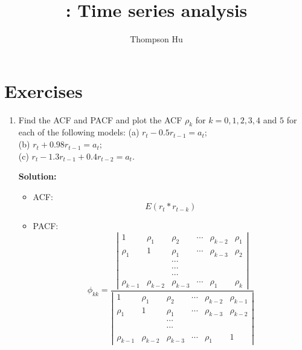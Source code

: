 \documentclass{article}
\title{\courseName: Time series analysis}
\author{Thompson Hu}
\date{} %
\begin{document}
\maketitle
\thispagestyle{fancy}

\section{Exercises}
\begin{enumerate}
	\item Find the ACF and PACF and plot the ACF $\rho_k$ for $k = 0,1,2,3,4$ and $5$ for each of the following models:
	(a) $r_{t}-0.5 r_{t-1}=a_{t};$\\
	(b) $r_{t}+0.98 r_{t-1}=a_{t};$\\
	(c) $r_{t}-1.3 r_{t-1}+0.4 r_{t-2}=a_{t}.$
	
	\textbf{Solution:}
	\begin{itemize}
		\item ACF:
		\begin{equation*}
		E(r_t * r_{t-k})
		\end{equation*}
		\item PACF: 
		\begin{equation*}
		\phi_{kk} = \frac{
			\left| \begin{array}{cccccc}{1} & {\rho_{1}} & {\rho_{2}} & {\cdots} & {\rho_{k-2}} & {\rho_{1}} \\ {\rho_{1}} & {1} & {\rho_{1}} & {\cdots} & {\rho_{k-3}} & {\rho_{2}} \\ { } & { } & {\cdots} & { } & { } \\ { } & { } & {\cdots} \\ { } & { } & {\cdots} \\ {\rho_{k-1}} & {\rho_{k-2}} & {\rho_{k-3}} & {\cdots} & {\rho_{1}} & {\rho_{k}}\end{array}\right|}{
			\left| \begin{array}{cccccc}{1} & {\rho_{1}} & {\rho_{2}} & {\cdots} & {\rho_{k-2}} & {\rho_{k-1}} \\ {\rho_{1}} & {1} & {\rho_{1}} & {\cdots} & {\rho_{k-3}} & {\rho_{k-2}} \\ { } & { } & {\cdots} & { } & { } \\ { } & { } & {\cdots} \\ {\rho_{k-1}} & {\rho_{k-2}} & {\rho_{k-3}} & {\cdots} & {\rho_{1}} & {1}\end{array}\right|
		}
		\end{equation*}
	\end{itemize}
	

\end{enumerate}
\end{document}
